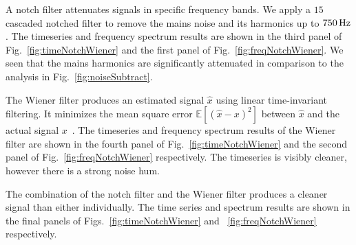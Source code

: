 \documentclass[paper-main.tex]{subfiles}
\begin{document}
A notch filter attenuates signals in specific frequency bands. 
We apply a $15$ cascaded notched filter to remove the mains noise and its harmonics up to $750\,{\rm Hz}$. 
The timeseries and frequency spectrum results are shown in the third panel of Fig.~\ref{fig:timeNotchWiener} and the first panel of Fig.~\ref{fig:freqNotchWiener}. 
We seen that the mains harmonics are significantly attenuated in comparison to the analysis in Fig.~\ref{fig:noiseSubtract}. 

The Wiener filter produces an estimated signal $\hat{x}$ using linear time-invariant filtering. 
It minimizes the mean square error $\mathbb{E}[(\hat{x}-x)^2]$ between $\hat{x}$ and the actual signal $x$~\citep{verhoeven2009robust}.
 \jam{[seconded]}
The timeseries and frequency spectrum results of the Wiener filter are shown in the fourth panel of Fig.~\ref{fig:timeNotchWiener} and the second panel of Fig.~\ref{fig:freqNotchWiener} respectively. 
The timeseries is visibly cleaner, however there is a strong noise hum. 

The combination of the notch filter and the Wiener filter produces a cleaner signal than either individually. 
The time series and spectrum results are shown in the final panels of Figs.~\ref{fig:timeNotchWiener} and ~\ref{fig:freqNotchWiener} respectively.








\end{document}
